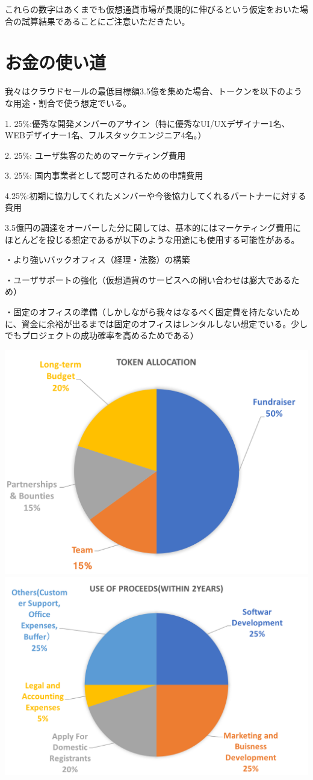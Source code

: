 \documentclass{jsarticle}
\begin{document}
これらの数字はあくまでも仮想通貨市場が長期的に伸びるという仮定をおいた場合の試算結果であることにご注意いただきたい。
\section{お金の使い道}
我々はクラウドセールの最低目標額3.5億を集めた場合、トークンを以下のような用途・割合で使う想定でいる。

1. 25\%:優秀な開発メンバーのアサイン（特に優秀なUI/UXデザイナー1名、WEBデザイナー1名、フルスタックエンジニア4名。）

2. 25\%: ユーザ集客のためのマーケティング費用

3. 25\%: 国内事業者として認可されるための申請費用

4.25\%:初期に協力してくれたメンバーや今後協力してくれるパートナーに対する費用

3.5億円の調達をオーバーした分に関しては、基本的にはマーケティング費用にほとんどを投じる想定であるが以下のような用途にも使用する可能性がある。

・より強いバックオフィス（経理・法務）の構築 

・ユーザサポートの強化（仮想通貨のサービスへの問い合わせは膨大であるため）

・固定のオフィスの準備（しかしながら我々はなるべく固定費を持たないために、資金に余裕が出るまでは固定のオフィスはレンタルしない想定でいる。少しでもプロジェクトの成功確率を高めるためである）

	\includegraphics[scale=0.4]{img/tokenallocation.png}
	\includegraphics[scale=0.4]{img/useofproceeds.png}
\end{document}
